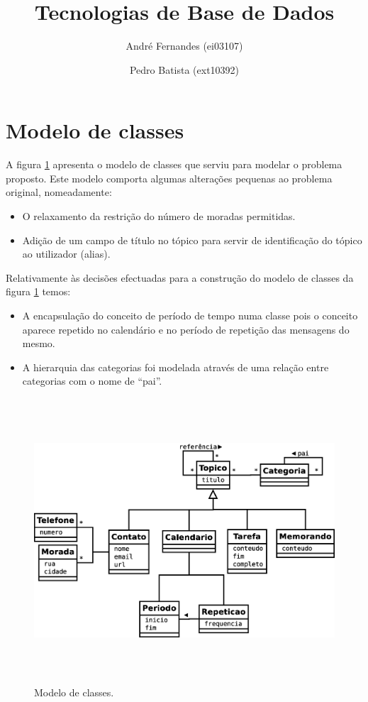 \documentclass[a4paper,12pt]{article}
\title{Tecnologias de Base de Dados}
\author{André Fernandes (ei03107) \and Pedro Batista (ext10392)}
\begin{document}
\maketitle

\section{Modelo de classes}

	A figura \ref{fig:classes} apresenta o modelo de classes que serviu para modelar o problema proposto. Este modelo comporta algumas alterações pequenas ao problema original, nomeadamente:

	\begin{itemize}
		\item O relaxamento da restrição do número de moradas permitidas. 	
		\item Adição de um campo de título no tópico para servir de identificação do tópico ao utilizador (alias).  
	\end{itemize}

	Relativamente às decisões efectuadas para a construção do modelo de classes da  figura \ref{fig:classes} temos:

	\begin{itemize}
		\item A encapsulação do conceito de período de tempo numa classe pois o conceito aparece repetido no calendário e no período de repetição das mensagens do mesmo.
		\item A hierarquia das categorias foi modelada através de uma relação entre categorias com o nome de ``pai''. 
	\end{itemize}

	\begin{figure}[htp]
		\begin{center}
			\includegraphics[height=300pt]{uml}
		\end{center}
		\caption{Modelo de classes.}
		\label{fig:classes}
	\end{figure}
\end{document}
